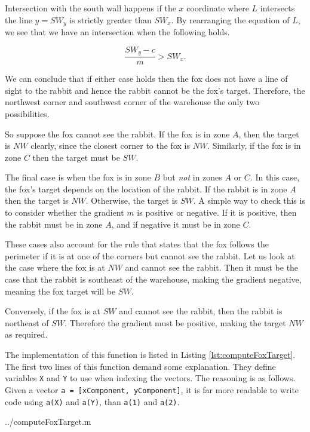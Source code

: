 Intersection with the south wall happens if the $x$ coordinate where $L$ intersects the line $y = SW_y$ is strictly greater than $SW_x$. By rearranging the equation of $L$, we see that we have an intersection when the following holds.

$$ \frac{SW_y - c}{m} > SW_x. $$

We can conclude that if either case holds then the fox does not have a line of sight to the rabbit and hence the rabbit cannot be the fox's target. Therefore, the northwest corner and southwest corner of the warehouse the only two possibilities.

So suppose the fox cannot see the rabbit. If the fox is in zone $A$, then the target is $NW$ clearly, since the closest corner to the fox is $NW$. Similarly, if the fox is in zone $C$ then the target must be $SW$. 

The final case is when the fox is in zone $B$ but \emph{not} in zones $A$ or $C$. In this case, the fox's target depends on the location of the rabbit. If the rabbit is in zone $A$ then the target is $NW$. Otherwise, the target is $SW$. A simple way to check this is to consider whether the gradient $m$ is positive or negative. If it is positive, then the rabbit must be in zone $A$, and if negative it must be in zone $C$. 

These cases also account for the rule that states that the fox follows the perimeter if it is at one of the corners but cannot see the rabbit. Let us look at the case where the fox is at $NW$ and cannot see the rabbit. Then it must be the case that the rabbit is southeast of the warehouse, making the gradient negative, meaning the fox target will be $SW$.

Conversely, if the fox is at $SW$ and cannot see the rabbit, then the rabbit is northeast of $SW$. Therefore the gradient must be positive, making the target $NW$ as required. 

The implementation of this function is listed in Listing \ref{lst:computeFoxTarget}. The first two lines of this function demand some explanation. They define variables \texttt{X} and \texttt{Y} to use when indexing the vectors. The reasoning is as follows. Given a vector \texttt{a = [xComponent, yComponent]}, it is far more readable to write code using \texttt{a(X)} and \texttt{a(Y)}, than \texttt{a(1)} and \texttt{a(2)}.

  {../computeFoxTarget.m}